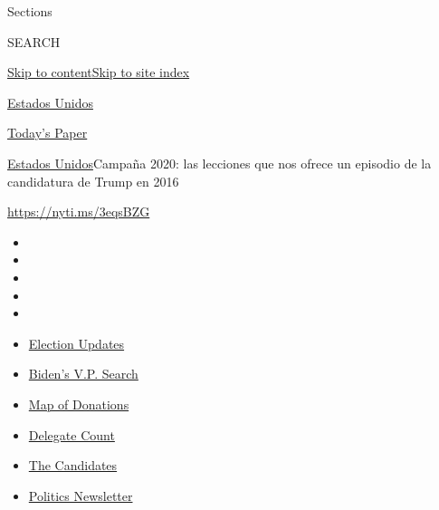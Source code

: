 Sections

SEARCH

\protect\hyperlink{site-content}{Skip to
content}\protect\hyperlink{site-index}{Skip to site index}

\href{https://www.nytimes.com/es/section/estados-unidos}{Estados Unidos}

\href{https://myaccount.nytimes.com/auth/login?response_type=cookie\&client_id=vi}{}

\href{https://www.nytimes.com/section/todayspaper}{Today's Paper}

\href{/es/section/estados-unidos}{Estados Unidos}\textbar{}Campaña 2020:
las lecciones que nos ofrece un episodio de la candidatura de Trump en
2016

\url{https://nyti.ms/3eqsBZG}

\begin{itemize}
\item
\item
\item
\item
\item
\end{itemize}

\begin{itemize}
\item
  \href{https://www.nytimes.com/2020/07/31/us/elections/biden-vs-trump.html?action=click\&pgtype=Article\&state=default\&region=TOP_BANNER\&context=storylines_menu}{Election
  Updates}
\item
  \href{https://www.nytimes.com/article/biden-vice-president-2020.html?action=click\&pgtype=Article\&state=default\&region=TOP_BANNER\&context=storylines_menu}{Biden's
  V.P. Search}
\item
  \href{https://www.nytimes.com/interactive/2020/07/24/us/politics/trump-biden-campaign-donors.html?action=click\&pgtype=Article\&state=default\&region=TOP_BANNER\&context=storylines_menu}{Map
  of Donations}
\item
  \href{https://www.nytimes.com/interactive/2020/us/elections/delegate-count-primary-results.html?action=click\&pgtype=Article\&state=default\&region=TOP_BANNER\&context=storylines_menu}{Delegate
  Count}
\item
  \href{https://www.nytimes.com/interactive/2019/us/politics/2020-presidential-candidates.html?action=click\&pgtype=Article\&state=default\&region=TOP_BANNER\&context=storylines_menu}{The
  Candidates}
\item
  \href{https://www.nytimes.com/newsletters/politics?action=click\&pgtype=Article\&state=default\&region=TOP_BANNER\&context=storylines_menu}{Politics
  Newsletter}
\end{itemize}

